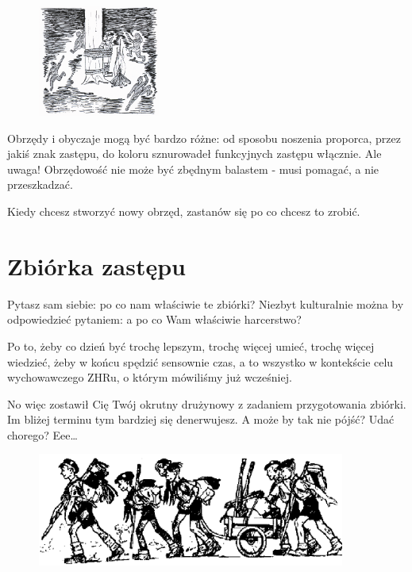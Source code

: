 \begin{figure}
\begin{center}
\includegraphics[width=4cm]{grafiki/drzewo.png}
\end{center}
\end{figure}Obrzędy i obyczaje  mogą  być  bardzo  różne:  od  sposobu  noszenia  proporca, przez  jakiś  znak  zastępu,  do  koloru  sznurowadeł  funkcyjnych zastępu  włącznie.  Ale uwaga! Obrzędowość nie  może być zbędnym balastem - musi pomagać, a nie  przeszkadzać.

Kiedy chcesz stworzyć nowy obrzęd,  zastanów się po co chcesz to  zrobić. 
 
\clearpage	
\section{Zbiórka zastępu}

Pytasz sam siebie: po co nam właściwie te zbiórki? 
Niezbyt kulturalnie można by odpowiedzieć pytaniem: a po co Wam właściwie harcerstwo?

Po to, żeby co dzień być trochę lepszym, trochę więcej umieć, trochę więcej wiedzieć, żeby  w końcu spędzić  sensownie czas, a to wszystko w kontekście celu wychowawczego ZHRu, o którym mówiliśmy już wcześniej.
	
No więc zostawił Cię Twój  okrutny drużynowy z zadaniem  przygotowania  zbiórki. 
Im bliżej terminu tym bardziej się denerwujesz. 
A może by tak nie pójść? 
Udać chorego? 
Eee\ldots

\begin{figure}[h]
\begin{center}
\includegraphics[width=0.9\textwidth]{grafiki/zbiorka.png}
\end{center}
\end{figure}
	
